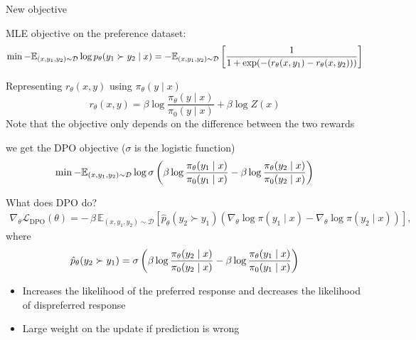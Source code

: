 \documentclass[usenames,dvipsnames,notes,11pt,aspectratio=169,hyperref={colorlinks=true, linkcolor=blue}]{beamer}
\begin{document}
\begin{frame}
    {New objective}
    \begin{wideitemize}[<+->]
        \item MLE objective on the preference dataset:
            $$
            \min - \mathbb{E}_{(x,y_1,y_2)\sim \mathcal{D}}\log p_\theta(y_1 \succ y_2 \mid x) = - \mathbb{E}_{(x,y_1,y_2)\sim \mathcal{D}} \left[ \frac{1}{1+\exp(-(r_\theta(x,y_1) - r_\theta(x,y_2)))}  \right]
            $$
        \item Representing $r_\theta(x,y)$ using $\pi_\theta(y\mid x)$
            $$
            r_\theta(x,y) = \beta\log\frac{\pi_\theta(y\mid x)}{\pi_0(y\mid x)} + \beta\log Z(x)
            $$
            Note that the objective only depends on the difference between the two rewards
        \item we get the DPO objective ($\sigma$ is the logistic function)
            $$
            \min - \mathbb{E}_{(x,y_1,y_2)\sim \mathcal{D}} \log \sigma \left( 
                \beta\log\frac{\pi_\theta(y_1\mid x)}{\pi_0(y_1\mid x)} - 
                \beta\log\frac{\pi_\theta(y_2\mid x)}{\pi_0(y_2\mid x)}
             \right)
            $$
    \end{wideitemize}
\end{frame}

\begin{frame}
    {What does DPO do?}
    \begin{align*}
\nabla_\theta \mathcal{L}_{\text{DPO}}(\theta) =
        - \, \beta \, \mathbb{E}_{(x, y_1, y_2) \sim \mathcal{D}} \left[ \hat{p}_\theta(y_2\succ y_1) \left( \nabla_\theta \log \pi(y_1 \mid x) - \nabla_\theta \log \pi(y_2 \mid x) \right) \right],
    \end{align*}
    where
    \begin{align*}
\hat{p}_\theta(y_2\succ y_1) = \sigma \left( 
                \beta\log\frac{\pi_\theta(y_2\mid x)}{\pi_0(y_2\mid x)} - 
                \beta\log\frac{\pi_\theta(y_1\mid x)}{\pi_0(y_1\mid x)}
             \right)
    \end{align*}
    \begin{itemize}
        \item Increases the likelihood of the preferred response and decreases the likelihood of dispreferred response
        \item Large weight on the update if prediction is wrong 
    \end{itemize}
\end{frame}
\end{document}
